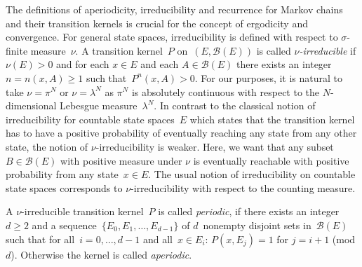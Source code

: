 The definitions of aperiodicity, irreducibility and recurrence for Markov chains and their transition kernels is crucial for the concept of ergodicity and convergence. For general state spaces, irreducibility is defined with respect to $\sigma$-finite measure~$\nu$. A transition kernel~$P$ on~$ \left( E, \mathcal{B}(E) \right) $ is called \textit{$\nu$-irreducible} if $\nu(E) > 0 $ and for each $x \in E$ and each $A \in \mathcal{B}(E)$ there exists an integer $n= n(x,A) \geq 1$ such that~$ P^n (x,A) > 0$. For our purposes, it is natural to take $\nu = \pi^{N}$ or $ \nu = \lambda^{N} $ as $\pi^{N}$ is absolutely continuous with respect to the $N$-dimensional Lebesgue measure~$\lambda^{N}$. In contrast to the classical notion of irreducibility for countable state spaces~$E$ which states that the transition kernel has to have a positive probability of eventually reaching any state from any other state, the notion of $ \nu $-irreducibility is weaker. Here, we want that any subset $B \in \mathcal{B}(E) $ with positive measure under $ \nu $ is eventually reachable with positive probability from any state~$ x \in E $. The usual notion of irreducibility on countable state spaces corresponds to $\nu$-irreducibility with respect to the counting measure.

A $\nu$-irreducible transition kernel~$P$ is called \textit{periodic}, if there exists an integer~$d \geq 2$ and a sequence~$\{ E_0, E_1, \dots, E_{d-1} \}$ of $d$~nonempty disjoint sets in~$\mathcal{B}(E)$ such that for all~$i=0,\dots, d-1$ and all~$x \in E_i$: $ P(x, E_j) =1 $ for $ j = i + 1 $ (mod $d$). Otherwise the kernel is called \textit{aperiodic}.


